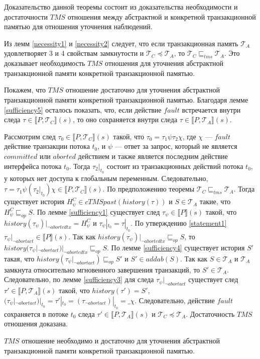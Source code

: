 \begin{mproof}
Доказательство данной теоремы состоит из доказательства необходимости и достаточности $TMS$ отношения между абстрактной и конкретной транзакционной памятью для отношения уточнения наблюдений.

Из лемм \ref{necessity1} и \ref{necessity2} следует, что если транзакционная память $\mathcal{T}_A$ удовлетворяет 3 и 4 свойствам замкнутости и $\mathcal{T}_C \preceq \mathcal{T}_A$, то $\mathcal{T}_C \sqsubseteq_{tms} \mathcal{T}_A$. Это доказывает необходимость $TMS$ отношения для уточнения абстрактной транзакционной памяти конкретной транзакционной памятью.

Покажем, что $TMS$ отношение достаточно для уточнения абстрактной транзакционной памяти конкретной транзакционной памятью. Благодаря лемме \ref{sufficiency5} осталось показать, что, если действие $fault$ встречается внутри следа $\tau \in \llbracket P, \mathcal{T}_C \rrbracket(s)$, то оно сохраняется внутри следа $\tau \in \llbracket P, \mathcal{T}_A \rrbracket(s)$.  

Рассмотрим след $\tau_0 \in \llbracket P, \mathcal{T}_C \rrbracket(s)$ такой, что $\tau_0 = \tau_1\psi\tau_2\chi$, где $\chi$ --- $fault$ действие транзакции потока $t_0$, и $\psi$ --- ответ за запрос, который не является $committed$ или $aborted$ действием и также является последним действие интерфейса потока $t_0$. Тогда $\tau_2|_{t_0}$ состоит из транзакционных действий потока $t_0$, у которых нет доступа к глобальным переменным. Следовательно, $\tau = \tau_1\psi(\tau_2|_{t_0})\chi \in \llbracket P, \mathcal{T}_C \rrbracket(s)$. По предположению теоремы $\mathcal{T}_C \sqsubseteq_{tms} \mathcal{T}_A$. Тогда существует история $H^C_{\psi} \in cTMSpast(history(\tau))$ и $S \in \mathcal{T}_A$ такие, что $H^C_{\psi} \sqsubseteq_{op} S$. По лемме \ref{sufficiency1} существует след $\tau_{\psi} \in \llbracket P \rrbracket(s)$ такой, что $history(\tau_{\psi})|_{\neg abortedtx} = H^C_{\psi}$ и $\tau_{\psi}|_{t_0} = \tau|_{t_0}$. По утверждению \ref{statement1} $\tau_{\psi}|_{\neg abortact} \in \llbracket P \rrbracket(s)$. Так как $history(\tau_{\psi})|_{\neg abortedtx} \sqsubseteq_{op} S$, то $history(\tau_{\psi}|_{\neg abortact})|_{\neg abortedtx} \sqsubseteq_{op} S$. По лемме \ref{sufficiency4} существует история $S'$ такая, что $history(\tau_{\psi}|_{\neg abortact}) \sqsubseteq_{op} S'$ и $S' \in addab(S)$. Так как $S \in \mathcal{T}_A$ и $\mathcal{T}_A$ замкнута относительно мгновенного завершения транзакций, то $S' \in \mathcal{T}_A$. Следовательно, по лемме \ref{sufficiency3} для следа $\tau_{\psi}|_{\neg abortact}$ существует след $\tau' \in \llbracket P, \mathcal{T}_A \rrbracket(s)$ такой, что $history(\tau') = S'$, $(\tau_{\psi}|_{\neg abortact})|_{t_0} = \tau'|_{t_0} =  (\tau_{\neg abortact})|_{t_0} = \_\chi$. Следовательно, действие $fault$ сохраняется в потоке $t_0$ следа $\tau' \in \llbracket P, \mathcal{T}_A \rrbracket(s)$ и $\mathcal{T}_C \preceq \mathcal{T}_A$. Достаточность $TMS$ отношения доказана.

$TMS$ отношение необходимо и достаточно для уточнения абстрактной транзакционной памяти конкретной транзакционной памятью.                 
\end{mproof}

